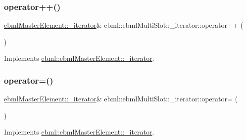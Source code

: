 \subsubsection{\texorpdfstring{operator++()}{operator++()}}
{\footnotesize\ttfamily \mbox{\hyperlink{classebml_1_1ebmlMasterElement_1_1__iterator}{ebml\+Master\+Element\+::\+\_\+iterator}}\& ebml\+::ebml\+Multi\+Slot\+::\+\_\+iterator\+::operator++ (\begin{DoxyParamCaption}{ }\end{DoxyParamCaption})\hspace{0.3cm}{\ttfamily [virtual]}}



Implements \mbox{\hyperlink{classebml_1_1ebmlMasterElement_1_1__iterator_ab77210fd0e481e1bb5b8563f7bd8142b}{ebml\+::ebml\+Master\+Element\+::\+\_\+iterator}}.

\mbox{\label{classebml_1_1ebmlMultiSlot_1_1__iterator_ae21fb8ce6820c3540dedf14eee28d24a}} 
\subsubsection{\texorpdfstring{operator=()}{operator=()}}
{\footnotesize\ttfamily \mbox{\hyperlink{classebml_1_1ebmlMasterElement_1_1__iterator}{ebml\+Master\+Element\+::\+\_\+iterator}}\& ebml\+::ebml\+Multi\+Slot\+::\+\_\+iterator\+::operator= (\begin{DoxyParamCaption}\item[{const \mbox{\hyperlink{classebml_1_1ebmlMasterElement_1_1__iterator}{ebml\+Master\+Element\+::\+\_\+iterator}} \&}]{ }\end{DoxyParamCaption})\hspace{0.3cm}{\ttfamily [virtual]}}



Implements \mbox{\hyperlink{classebml_1_1ebmlMasterElement_1_1__iterator_a849c5027957fa1a022de0417aea1ad9e}{ebml\+::ebml\+Master\+Element\+::\+\_\+iterator}}.

\mbox{\label{classebml_1_1ebmlMultiSlot_1_1__iterator_a306e7fd7a564d17febbb08a75dd95b36}} 
